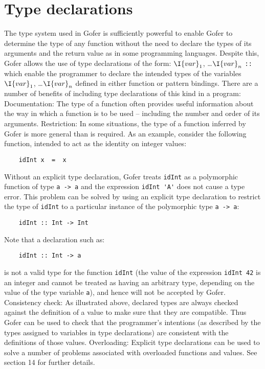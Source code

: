 \section{Type declarations}
The type system used in Gofer is sufficiently powerful to enable  Gofer
to determine the type of any function without the need to  declare  the
types of its arguments and the return  value  as  in  some  programming
languages.  Despite this, Gofer allows the use of type declarations  of
the form:
\BQ
    $\I{var}_1$, \dots $\I{var}_n$ \verb"::" 
\EQ
which enable the programmer  to  declare  the  intended  types  of  the
variables $\I{var}_1$,  \dots  $\I{var}_n$
defined  in  either  function  or  pattern
bindings.   There  are  a  number  of  benefits   of   including   type
declarations of this kind in a program:
\BI
\IT  Documentation: The  type  of  a  function  often  provides  useful
     information about the way in which a function is  to  be  used  --
     including the number and order of its arguments.
\IT  Restriction: In some situations, the type of a  function  inferred
     by Gofer is  more  general  than  is  required.   As  an  example,
     consider the following function, intended to act as  the  identity
     on integer values:
\begin{verbatim}
    idInt x  =  x
\end{verbatim}
     Without an explicit type declaration, Gofer treats  \verb"idInt"  as  a
     polymorphic function of type \verb"a -> a" and the expression \verb"idInt 'A'"
     does not cause a type error.  This problem can  be  solved
     by using an explicit type declaration  to  restrict  the  type  of
     \verb"idInt" to a particular instance of the polymorphic 
     type \verb"a -> a":
\begin{verbatim}
    idInt :: Int -> Int
\end{verbatim}
     Note that a declaration such as:
\begin{verbatim}
    idInt :: Int -> a
\end{verbatim}
     is not a valid type for the function \verb"idInt"  (the  value  of  the
     expression \verb"idInt 42" is an  integer  and  cannot  be  treated  as
     having an arbitrary type, depending  on  the  value  of  the  type
     variable \verb"a"), and hence will not be accepted by Gofer.
\IT  Consistency check: As illustrated above, declared types are always
     checked against the definition of a value to make sure  that  they
     are compatible.   Thus  Gofer  can  be  used  to  check  that  the
     programmer's intentions (as described  by  the  types  assigned  to
     variables  in  type  declarations)   are   consistent   with   the
     definitions of those values.
\IT  Overloading: Explicit type declarations can be  used  to  solve  a
     number  of  problems  associated  with  overloaded  functions  and
     values.  See section 14 for further details.
\EI

